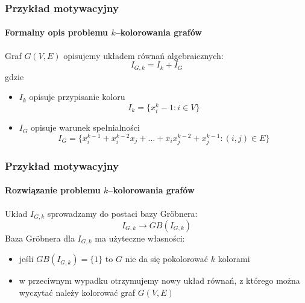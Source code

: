 \documentclass{beamer}
\begin{document}
\begin{frame}
    \frametitle{Przykład motywacyjny}
    \framesubtitle{Formalny opis problemu $k$--kolorowania grafów}

    Graf $G(V, E)$ opisujemy układem równań algebraicznych:
    \begin{equation*}
        I_{G,k} = I_k + I_G
    \end{equation*}
    gdzie
    \pause
    \begin{itemize}
        \item $I_k$ opisuje przypisanie koloru
            \begin{equation*}
                I_k = \{ x_i^k - 1 : i \in V \}
            \end{equation*}
            \pause
        \item $I_G$ opisuje warunek spełnialności
            \begin{equation*}
                I_G = \{ x_{i}^{k-1} + x_{i}^{k-2} x_{j} + \ldots + x_{i} x_{j}^{k-2} + x_{j}^{k-1} : (i, j) \in E \}
            \end{equation*}
    \end{itemize}
\end{frame}

\begin{frame}
    \frametitle{Przykład motywacyjny}
    \framesubtitle{Rozwiązanie problemu $k$--kolorowania grafów}

    Układ $I_{G,k}$ sprowadzamy do postaci bazy Gr\"{o}bnera:
    \begin{equation*}
        I_{G,k} \rightarrow GB(I_{G,k})
    \end{equation*}
    \pause
    Baza Gr\"{o}bnera dla $I_{G,k}$ ma użyteczne własności:
    \begin{itemize}
        \item jeśli $GB(I_{G,k}) = \{1\}$ to $G$ nie da się pokolorować $k$ kolorami
        \pause
        \item w przeciwnym wypadku otrzymujemy nowy układ równań, z którego można wyczytać
         należy kolorować graf $G(V, E)$
    \end{itemize}
\end{frame}
\end{document}
